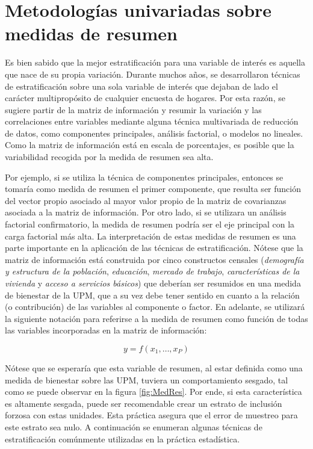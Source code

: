 \documentclass[
  12pt,
  spanish,
]{book}
\begin{document}
\hypertarget{metodologuxedas-univariadas-sobre-medidas-de-resumen}{%
\section{Metodologías univariadas sobre medidas de resumen}\label{metodologuxedas-univariadas-sobre-medidas-de-resumen}}

Es bien sabido que la mejor estratificación para una variable de interés es aquella que nace de su propia variación. Durante muchos años, se desarrollaron técnicas de estratificación sobre una sola variable de interés que dejaban de lado el carácter multipropósito de cualquier encuesta de hogares. Por esta razón, se sugiere partir de la matriz de información y resumir la variación y las correlaciones entre variables mediante alguna técnica multivariada de reducción de datos, como componentes principales, análisis factorial, o modelos no lineales. Como la matriz de información está en escala de porcentajes, es posible que la variabilidad recogida por la medida de resumen sea alta.

Por ejemplo, si se utiliza la técnica de componentes principales, entonces se tomaría como medida de resumen el primer componente, que resulta ser función del vector propio asociado al mayor valor propio de la matriz de covarianzas asociada a la matriz de información. Por otro lado, si se utilizara un análisis factorial confirmatorio, la medida de resumen podría ser el eje principal con la carga factorial más alta. La interpretación de estas medidas de resumen es una parte importante en la aplicación de las técnicas de estratificación. Nótese que la matriz de información está construida por cinco constructos censales (\emph{demografía y estructura de la población}, \emph{educación}, \emph{mercado de trabajo}, \emph{características de la vivienda} y \emph{acceso a servicios básicos}) que deberían ser resumidos en una medida de bienestar de la UPM, que a su vez debe tener sentido en cuanto a la relación (o contribución) de las variables al componente o factor. En adelante, se utilizará la siguiente notación para referirse a la medida de resumen como función de todas las variables incorporadas en la matriz de información:

\[
y = f(x_1,\ldots, x_P)
\]

Nótese que se esperaría que esta variable de resumen, al estar definida como una medida de bienestar sobre las UPM, tuviera un comportamiento sesgado, tal como se puede observar en la figura \ref{fig:MedRes}. Por ende, si esta característica es altamente sesgada, puede ser recomendable crear un estrato de inclusión forzosa con estas unidades. Esta práctica asegura que el error de muestreo para este estrato sea nulo. A continuación se enumeran algunas técnicas de estratificación comúnmente utilizadas en la práctica estadística.
\end{document}
